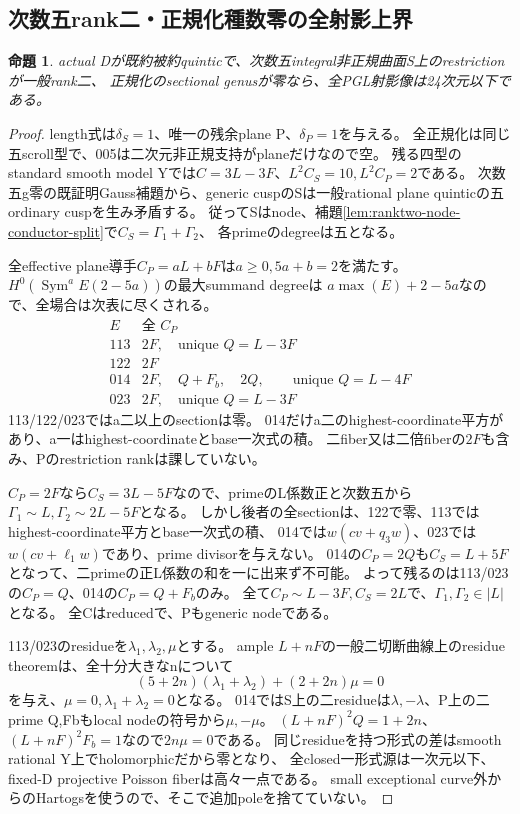 \documentclass[a4paper,11pt]{ltjsarticle}
\newtheorem{proposition}{命題}[section]
\theoremstyle{definition}
\begin{document}
\subsection{次数五rank二・正規化種数零の全射影上界}
\begin{proposition}\label{prop:ranktwo-quintic-genuszero-G}
actual Dが既約被約quinticで、次数五integral非正規曲面S上のrestrictionが一般rank二、
正規化のsectional genusが零なら、全PGL射影像は24次元以下である。
\end{proposition}
\begin{proof}
length式は$\delta_S=1$、唯一の残余plane P、$\delta_P=1$を与える。
全正規化は同じ五scroll型で、005は二次元非正規支持がplaneだけなので空。
残る四型のstandard smooth model Yでは$C=3L-3F$、$L^2C_S=10,L^2C_P=2$である。
次数五g零の既証明Gauss補題から、generic cuspのSは一般rational plane quinticの五ordinary cuspを生み矛盾する。
従ってSはnode、補題\ref{lem:ranktwo-node-conductor-split}で$C_S=\Gamma_1+\Gamma_2$、
各primeのdegreeは五となる。

全effective plane導手$C_P=aL+bF$は$a\ge0,5a+b=2$を満たす。
$H^0(\operatorname{Sym}^aE(2-5a))$の最大summand degreeは
$a\max(E)+2-5a$なので、全場合は次表に尽くされる。
\[
 \begin{array}{c|l}
 E&\text{全 }C_P\\ \hline
 113&2F,\quad\text{unique }Q=L-3F\\
 122&2F\\
 014&2F,\quad Q+F_b,\quad2Q,\qquad\text{unique }Q=L-4F\\
 023&2F,\quad\text{unique }Q=L-3F
 \end{array}
\]
113/122/023ではa二以上のsectionは零。
014だけa二のhighest-coordinate平方があり、a一はhighest-coordinateとbase一次式の積。
二fiber又は二倍fiberの$2F$も含み、Pのrestriction rankは課していない。

$C_P=2F$なら$C_S=3L-5F$なので、primeのL係数正と次数五から
$\Gamma_1\sim L,\Gamma_2\sim2L-5F$となる。
しかし後者の全sectionは、122で零、113ではhighest-coordinate平方とbase一次式の積、
014では$w(cv+q_3w)$、023では$w(cv+\ell_1w)$であり、prime divisorを与えない。
014の$C_P=2Q$も$C_S=L+5F$となって、二primeの正L係数の和を一に出来ず不可能。
よって残るのは113/023の$C_P=Q$、014の$C_P=Q+F_b$のみ。
全て$C_P\sim L-3F,C_S=2L$で、$\Gamma_1,\Gamma_2\in|L|$となる。
全Cはreducedで、Pもgeneric nodeである。

113/023のresidueを$\lambda_1,\lambda_2,\mu$とする。
ample $L+nF$の一般二切断曲線上のresidue theoremは、全十分大きなnについて
\[
 (5+2n)(\lambda_1+\lambda_2)+(2+2n)\mu=0
\]
を与え、$\mu=0,\lambda_1+\lambda_2=0$となる。
014ではS上の二residueは$\lambda,-\lambda$、P上の二prime Q,Fbもlocal nodeの符号から$\mu,-\mu$。
$(L+nF)^2Q=1+2n$、$(L+nF)^2F_b=1$なので$2n\mu=0$である。
同じresidueを持つ形式の差はsmooth rational Y上でholomorphicだから零となり、
全closed一形式源は一次元以下、fixed-D projective Poisson fiberは高々一点である。
small exceptional curve外からのHartogsを使うので、そこで追加poleを捨てていない。


\end{proof}
\end{document}
